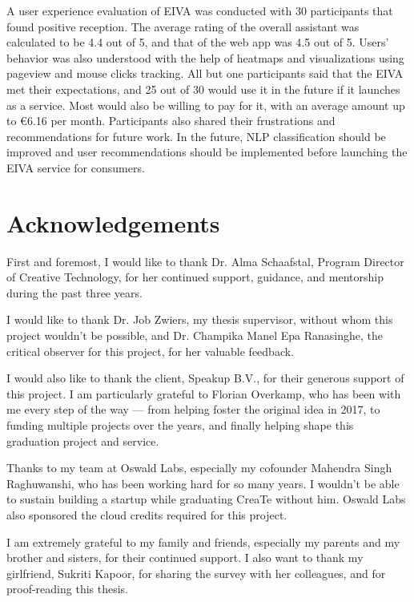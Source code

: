 \documentclass{article}
\begin{document}
A user experience evaluation of EIVA was conducted with 30 participants that found positive reception. The average rating of the overall assistant was calculated to be 4.4 out of 5, and that of the web app was 4.5 out of 5. Users' behavior was also understood with the help of heatmaps and visualizations using pageview and mouse clicks tracking. All but one participants said that the EIVA met their expectations, and 25 out of 30 would use it in the future if it launches as a service. Most would also be willing to pay for it, with an average amount up to €6.16 per month. Participants also shared their frustrations and recommendations for future work. In the future, NLP classification should be improved and user recommendations should be implemented before launching the EIVA service for consumers.

\newpage

\section*{Acknowledgements}

First and foremost, I would like to thank Dr. Alma Schaafstal, Program Director of Creative Technology, for her continued support, guidance, and mentorship during the past three years.

I would like to thank Dr. Job Zwiers, my thesis supervisor, without whom this project wouldn't be possible, and Dr. Champika Manel Epa Ranasinghe, the critical observer for this project, for her valuable feedback.

I would also like to thank the client, Speakup B.V., for their generous support of this project. I am particularly grateful to Florian Overkamp, who has been with me every step of the way --- from helping foster the original idea in 2017, to funding multiple projects over the years, and finally helping shape this graduation project and service.

Thanks to my team at Oswald Labs, especially my cofounder Mahendra Singh Raghuwanshi, who has been working hard for so many years. I wouldn't be able to sustain building a startup while graduating CreaTe without him. Oswald Labs also sponsored the cloud credits required for this project.

I am extremely grateful to my family and friends, especially my parents and my brother and sisters, for their continued support. I also want to thank my girlfriend, Sukriti Kapoor, for sharing the survey with her colleagues, and for proof-reading this thesis.
\end{document}
